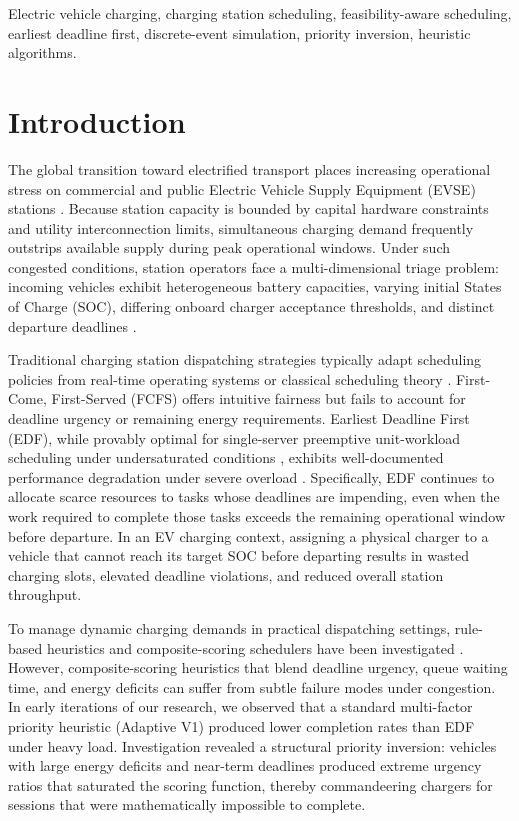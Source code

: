 \documentclass[conference]{IEEEtran}
\begin{document}
\begin{IEEEkeywords}
Electric vehicle charging, charging station scheduling, feasibility-aware scheduling, earliest deadline first, discrete-event simulation, priority inversion, heuristic algorithms.
\end{IEEEkeywords}

\section{Introduction}
\label{sec:intro}
The global transition toward electrified transport places increasing operational stress on commercial and public Electric Vehicle Supply Equipment (EVSE) stations \cite{clement2010impact, mukherjee2014a, alogaili2019review}. Because station capacity is bounded by capital hardware constraints and utility interconnection limits, simultaneous charging demand frequently outstrips available supply during peak operational windows. Under such congested conditions, station operators face a multi-dimensional triage problem: incoming vehicles exhibit heterogeneous battery capacities, varying initial States of Charge (SOC), differing onboard charger acceptance thresholds, and distinct departure deadlines \cite{ma2013decentralized, gan2013optimal, he2012optimal, ortegavazquez2014optimal}.

Traditional charging station dispatching strategies typically adapt scheduling policies from real-time operating systems or classical scheduling theory \cite{lawler1969functional}. First-Come, First-Served (FCFS) offers intuitive fairness but fails to account for deadline urgency or remaining energy requirements. Earliest Deadline First (EDF), while provably optimal for single-server preemptive unit-workload scheduling under undersaturated conditions \cite{liu1973scheduling}, exhibits well-documented performance degradation under severe overload \cite{buttazzo2011hard}. Specifically, EDF continues to allocate scarce resources to tasks whose deadlines are impending, even when the work required to complete those tasks exceeds the remaining operational window before departure. In an EV charging context, assigning a physical charger to a vehicle that cannot reach its target SOC before departing results in wasted charging slots, elevated deadline violations, and reduced overall station throughput.

To manage dynamic charging demands in practical dispatching settings, rule-based heuristics and composite-scoring schedulers have been investigated \cite{vagropoulos2019comparison, dehoog2015optimal}. However, composite-scoring heuristics that blend deadline urgency, queue waiting time, and energy deficits can suffer from subtle failure modes under congestion. In early iterations of our research, we observed that a standard multi-factor priority heuristic (Adaptive V1) produced lower completion rates than EDF under heavy load. Investigation revealed a structural priority inversion: vehicles with large energy deficits and near-term deadlines produced extreme urgency ratios that saturated the scoring function, thereby commandeering chargers for sessions that were mathematically impossible to complete.
\end{document}

